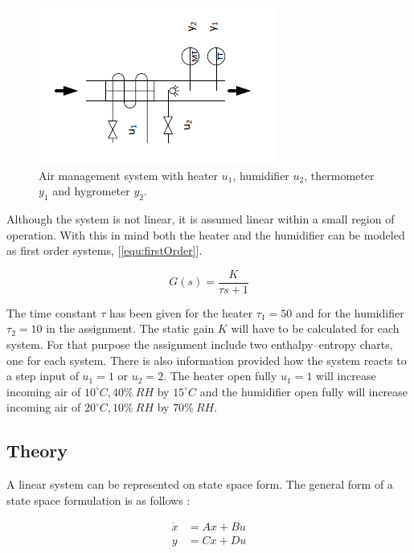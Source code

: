 \documentclass[a4paper, titlepage]{article}
\begin{document}
\begin{figure}[h!]
\center
\includegraphics[scale=1]{../figures/heaterHumidifier.png}
\caption{Air management system with heater $u_1$, humidifier $u_2$, thermometer $y_1$ and hygrometer $y_2$.}
\label{fig:airSystem}
\end{figure}

Although the system is not linear, it is assumed linear within a small region of operation.
With this in mind both the heater and the humidifier can be modeled as first order systems, [\ref{equ:firstOrder}].

\begin{equation}
G(s) = \frac{K}{\tau s + 1}
\label{equ:firstOrder}
\end{equation}

The time constant $\tau$ has been given for the heater $\tau_1=50$ and for the humidifier $\tau_2=10$ in the assignment.
The static gain $K$ will have to be calculated for each system.
For that purpose the assignment include two enthalpy–entropy charts, one for each system.
There is also information provided how the system reacts to a step input of $u_1 = 1$ or $u_2 = 2$.
The heater open fully $u_1 = 1$ will increase incoming air of $10^\circ C, 40\% \: RH$ by $15^\circ C$ and the humidifier open fully will increase incoming air of $20^\circ C, 10\% \: RH$ by $70\% \: RH$.

\subsection{Theory}
A linear system can be represented on state space form.
The general form of a state space formulation is as follows \citep[p.~31]{glad00}:

\begin{equation}
\begin{split}
\dot{x} &= Ax + Bu \\
y &= Cx + Du
\end{split}
\label{equ:stateSpace}
\end{equation}
\end{document}
